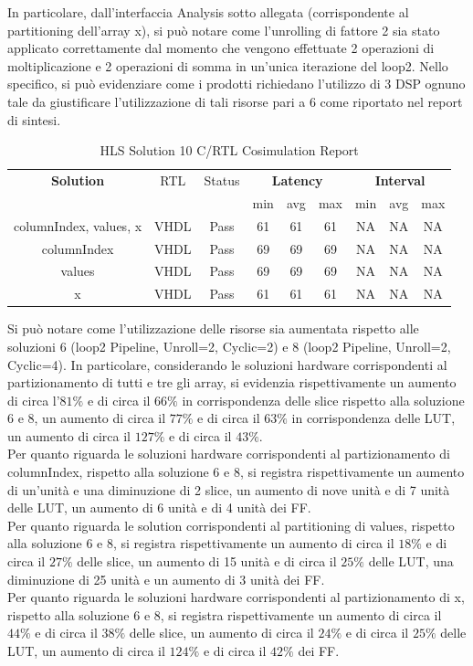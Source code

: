 In particolare, dall'interfaccia Analysis sotto allegata (corrispondente al partitioning dell'array x), si può notare come l'unrolling di fattore 2 sia stato applicato correttamente dal momento che vengono effettuate 2 operazioni di moltiplicazione e 2 operazioni di somma in un'unica iterazione del loop2. Nello specifico, si può evidenziare come i prodotti richiedano l'utilizzo di 3 DSP ognuno tale da giustificare l'utilizzazione di tali risorse pari a 6 come riportato nel report di sintesi. 

\begin{table}[H]
	\centering
	\begin{tabular}{|c|c|c|c|c|c|c|c|c|}
		\hline
		\multicolumn{1}{|c|}{\textbf{Solution}} & \multicolumn{1}{|c|}{RTL} & \multicolumn{1}{|c|}{Status} & \multicolumn{3}{c|}{\textbf{Latency}} & \multicolumn{3}{c|}{\textbf{Interval}} \\
		& &  & min & avg & max & min & avg & max \\
		\hline
		columnIndex, values, x & VHDL & Pass & 61 & 61 & 61 & NA & NA & NA \\
		\hline
		columnIndex & VHDL & Pass & 69 & 69 & 69 & NA & NA & NA \\
		\hline
		values & VHDL & Pass & 69 & 69 & 69 & NA & NA & NA \\
		\hline
		x & VHDL & Pass & 61 & 61 & 61 & NA & NA & NA \\
		\hline
	\end{tabular}
	\caption{HLS Solution 10 C/RTL Cosimulation Report }
	\label{tab:hls-solution-10-cosimulation-report}
\end{table}

Si può notare come l'utilizzazione delle risorse sia aumentata rispetto alle soluzioni 6 (loop2 Pipeline, Unroll=2, Cyclic=2) e 8 (loop2 Pipeline, Unroll=2, Cyclic=4). In particolare, considerando le soluzioni hardware corrispondenti al partizionamento di tutti e tre gli array, si evidenzia rispettivamente un aumento di circa l'$81\%$ e di circa il $66\%$ in corrispondenza delle slice rispetto alla soluzione 6 e 8, un aumento di circa il $77\%$ e di circa il $63\%$ in corrispondenza delle LUT, un aumento di circa il $127\%$ e di circa il $43\%$. 
\\
Per quanto riguarda le soluzioni hardware corrispondenti al partizionamento di columnIndex, rispetto alla soluzione 6 e 8, si registra rispettivamente un aumento di un'unità e una diminuzione di 2 slice, un aumento di nove unità e di 7 unità delle LUT, un aumento di 6 unità e di 4 unità dei FF. 
\\
Per quanto riguarda le solution corrispondenti al partitioning di values, rispetto alla soluzione 6 e 8, si registra rispettivamente un aumento di circa il $18\%$ e di circa il $27\%$ delle slice, un aumento di 15 unità e di circa il $25\%$ delle LUT, una diminuzione di 25 unità e un aumento di 3 unità dei FF. 
\\
Per quanto riguarda le soluzioni hardware corrispondenti al partizionamento di x, rispetto alla soluzione 6 e 8, si registra rispettivamente un aumento di circa il $44\%$ e di circa il $38\%$ delle slice, un aumento di circa il $24\%$ e di circa il $25\%$ delle LUT, un aumento di circa il $124\%$ e di circa il $42\%$ dei FF.


